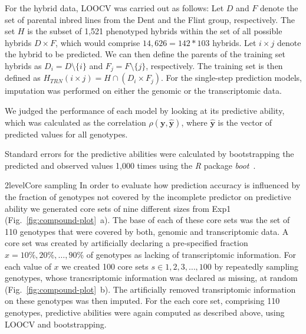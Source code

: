 \documentclass[12pt,titlepage]{article}
\begin{document}
For the hybrid data, LOOCV was carried out as follows:
Let $D$ and $F$ denote the set of parental inbred lines from the Dent and the 
Flint group, respectively.
The set $H$ is the subset of 1,521 phenotyped hybrids within the set of all
possible hybrids $D \times F$, which would comprise $14,626 = 142 * 103$
hybrids.
Let $i \times j$ denote the hybrid to be predicted.
We can then define the parents of the training set hybrids as
$D_{i} = D \setminus \{i\}$ and $F_{j} = F \setminus \{j\}$, respectively.
The training set is then defined as 
$H_{TRN}(i \times j) = H \cap (D_{i} \times F_{j})$.
For the single-step prediction models, imputation was performed on either the
genomic or the transcriptomic data.

We judged the performance of each model by looking at its predictive ability,
which was calculated as the correlation $\rho(\mathbf{y}, \mathbf{\hat{y}})$,
where $\mathbf{\hat{y}}$ is the vector of predicted values for all genotypes.

Standard errors for the predictive abilities were calculated by bootstrapping
the predicted and observed values 1,000 times using the \emph{R} package 
\emph{boot}~\cite{Canty2017}.



\Genetics2level{Core sampling}
In order to evaluate how prediction accuracy is influenced by the fraction of
genotypes not covered by the incomplete predictor on predictive ability we
generated core sets of nine different sizes from Exp1
(Fig.~\ref{fig:compound-plot}~a).
The base of each of these core sets was the set of 110 genotypes that were
covered by both, genomic and transcriptomic data.
A core set was created by artificially declaring a pre-specified fraction 
$x = {10\%, 20\%, \dots, 90\%}$ of genotypes as lacking of transcriptomic 
information.
For each value of $x$ we created 100 core sets $s \in {1, 2, 3, \dots, 100}$ by
repeatedly sampling genotypes, whose trancsriptomic information was declared
as missing, at random (Fig.~\ref{fig:compound-plot}~b).
The artificially removed transriptomic information on these genotypes was then
imputed.
For the each core set, comprising 110 genotypes, predictive abilities were again
computed as described above, using LOOCV and bootstrapping.
\end{document}
